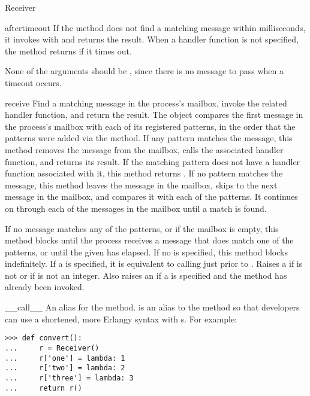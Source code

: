 \documentclass{howto}
\begin{document}
\begin{classdesc}{Receiver}{}
\begin{methoddesc}{after}{timeout}
If the  method does not find a matching message within
 milliseconds, it invokes  with  and returns
the result. When a handler function  is not specified, the
 method returns  if it times out.

None of the  arguments should be , since
there is no message to pass when a timeout occurs.
\end{methoddesc}

\begin{methoddesc}{receive}{}
Find a matching message in the process's mailbox, invoke the related handler
function, and return the result. The  object compares the first
message in the process's mailbox with each of its registered patterns, in the
order that the patterns were added via the  method. If any
pattern matches the message, this method removes the message from the mailbox,
calls the associated handler function, and returns its result. If the matching
pattern does not have a handler function associated with it, this method returns
. If no pattern matches the message, this method leaves the
message in the mailbox, skips to the next message in the mailbox, and compares
it with each of the patterns. It continues on through each of the messages in
the mailbox until a match is found.

If no message matches any of the patterns, or if the mailbox is empty, this
method blocks until the process receives a message that does match one of the
patterns, or until the given  has elapsed. If no  is
specified, this method blocks indefinitely. If a  is specified, it
is equivalent to calling 
just prior to . Raises a 
 if  is not  or if
 is not an integer. Also raises an  if a
 is specified and the  method has already been
invoked.
\end{methoddesc}

\begin{methoddesc}{__call__}{}
\opindex{()}
An alias for the  method.  is an alias to
the  method so that developers can use a shortened, more
Erlangy syntax with s. For example:
\begin{verbatim}
>>> def convert():
...     r = Receiver()
...     r['one'] = lambda: 1
...     r['two'] = lambda: 2
...     r['three'] = lambda: 3
...     return r()
\end{verbatim}
\end{methoddesc}


\end{classdesc}
\end{document}
